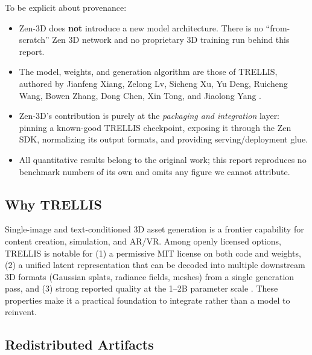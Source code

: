 \documentclass[11pt,a4paper]{article}
\begin{document}
To be explicit about provenance:

\begin{itemize}
    \item Zen-3D does \textbf{not} introduce a new model architecture. There is no
    ``from-scratch'' Zen 3D network and no proprietary 3D training run behind this report.
    \item The model, weights, and generation algorithm are those of TRELLIS, authored by
    Jianfeng Xiang, Zelong Lv, Sicheng Xu, Yu Deng, Ruicheng Wang, Bowen Zhang, Dong Chen,
    Xin Tong, and Jiaolong Yang \cite{xiang2024trellis}.
    \item Zen-3D's contribution is purely at the \emph{packaging and integration} layer:
    pinning a known-good TRELLIS checkpoint, exposing it through the Zen SDK, normalizing its
    output formats, and providing serving/deployment glue.
    \item All quantitative results belong to the original work; this report reproduces no
    benchmark numbers of its own and omits any figure we cannot attribute.
\end{itemize}

\subsection{Why TRELLIS}

Single-image and text-conditioned 3D asset generation is a frontier capability for content
creation, simulation, and AR/VR. Among openly licensed options, TRELLIS is notable for (1) a
permissive MIT license on both code and weights, (2) a unified latent representation that can be
decoded into multiple downstream 3D formats (Gaussian splats, radiance fields, meshes) from a
single generation pass, and (3) strong reported quality at the 1--2B parameter scale
\cite{xiang2024trellis}. These properties make it a practical foundation to integrate rather
than a model to reinvent.

\subsection{Redistributed Artifacts}
\end{document}
